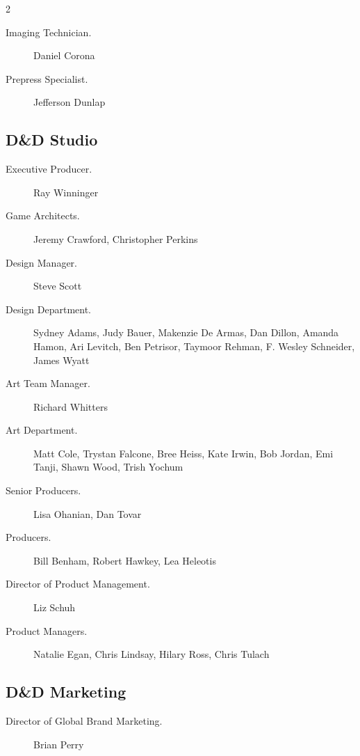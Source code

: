 \documentclass[10pt,a4paper,twoside,fancy,bg=print,twocolumn,openany,nodeprecatedcode]{dndbook}
\begin{document}
\begin{description}
\begin{multicols}{2}
\begin{description}
\item[Imaging Technician.]
Daniel Corona

\item[Prepress Specialist.]
Jefferson Dunlap

\end{description}

\subsection{D\&D Studio}

\begin{description}
\item[Executive Producer.]
Ray Winninger

\item[Game Architects.]
Jeremy Crawford, Christopher Perkins

\item[Design Manager.]
Steve Scott

\item[Design Department.]
Sydney Adams, Judy Bauer, Makenzie De Armas, Dan Dillon, Amanda Hamon, Ari Levitch, Ben Petrisor, Taymoor Rehman, F. Wesley Schneider, James Wyatt

\item[Art Team Manager.]
Richard Whitters

\item[Art Department.]
Matt Cole, Trystan Falcone, Bree Heiss, Kate Irwin, Bob Jordan, Emi Tanji, Shawn Wood, Trish Yochum

\item[Senior Producers.]
Lisa Ohanian, Dan Tovar

\item[Producers.]
Bill Benham, Robert Hawkey, Lea Heleotis

\item[Director of Product Management.]
Liz Schuh

\item[Product Managers.]
Natalie Egan, Chris Lindsay, Hilary Ross, Chris Tulach

\end{description}

\subsection{D\&D Marketing}

\begin{description}
\item[Director of Global Brand Marketing.]
Brian Perry


\end{description}
\end{multicols}
\end{description}
\end{document}

